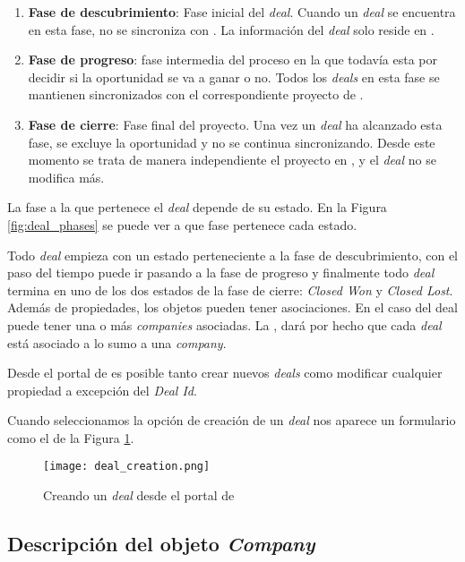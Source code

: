 		\begin{enumerate}
			\item \textbf{Fase de descubrimiento}: Fase inicial del \textit{deal}. Cuando un \textit{deal} se encuentra en esta fase, no se sincroniza con \wday. La información del \textit{deal} solo reside en \hs.
			\item \textbf{Fase de progreso}: fase intermedia del proceso en la que todavía esta por decidir si la oportunidad se va a ganar o no. Todos los \textit{deals} en esta fase se mantienen sincronizados con el correspondiente proyecto de \wday.
			\item \textbf{Fase de cierre}: Fase final del proyecto. Una vez un \textit{deal} ha alcanzado esta fase, se excluye la oportunidad y no se continua sincronizando. Desde este momento se trata de manera independiente el proyecto en \wday{}, y el \textit{deal} no se modifica más. 
		\end{enumerate}
	
		La fase a la que pertenece el \textit{deal} depende de su estado. En la Figura \ref{fig:deal_phases} se puede ver a que fase pertenece cada estado.
		
		
		Todo \textit{deal} empieza con un estado perteneciente a la fase de descubrimiento, con el paso del tiempo puede ir pasando a la fase de progreso y finalmente todo \textit{deal} termina en uno de los dos estados de la fase de cierre: \textit{Closed Won} y \textit{Closed Lost}.\\
			
			
		Además de propiedades, los objetos pueden tener asociaciones. En el caso del deal puede tener una o más \textit{companies} asociadas. La \iface{}, dará por hecho que cada \textit{deal} está asociado a lo sumo a una \textit{company}.
			
		Desde el portal de \hs{} es posible tanto crear nuevos \textit{deals} como modificar cualquier propiedad a excepción del \textit{Deal Id}.
		
		Cuando seleccionamos la opción de creación de un \textit{deal} nos aparece un formulario como el de la Figura \ref{fig:create_deal}.
		
		\begin{figure}
			\centering
			\texttt{[image: deal\_creation.png]}
			\caption{Creando un \textit{deal} desde el portal de \hs{}}
			\label{fig:create_deal}
		\end{figure}

\subsection{Descripción del objeto \textit{Company}}
		
